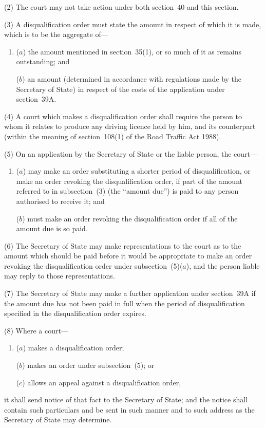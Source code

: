 \documentclass[12pt,a4paper]{article}
\begin{document}
(2) The court may not take action under both section~40 and this section.

(3) A disqualification order must state the amount in respect of which it is made, which is to be the aggregate of—
\begin{enumerate}\item[]
($a$) the amount mentioned in section~35(1), or so much of it as remains outstanding; and

($b$) an amount (determined in accordance with regulations made by the Secretary of State) in respect of the costs of the application under section~39A.
\end{enumerate}

(4) A court which makes a disqualification order shall require the person to whom it relates to produce any driving licence held by him, and its counterpart (within the meaning of section~108(1)  of the Road Traffic Act 1988).

(5) On an application by the Secretary of State or the liable person, the court—
\begin{enumerate}\item[]
($a$) may make an order substituting a shorter period of disqualification, or make an order revoking the disqualification order, if part of the amount referred to in subsection~(3)  (the “amount due”) is paid to any person authorised to receive it; and

($b$) must make an order revoking the disqualification order if all of the amount due is so paid.
\end{enumerate}

(6) The Secretary of State may make representations to the court as to the amount which should be paid before it would be appropriate to make an order revoking the disqualification order under subsection~(5)($a$), and the person liable may reply to those representations.

(7) The Secretary of State may make a further application under section~39A if the amount due has not been paid in full when the period of disqualification specified in the disqualification order expires.

(8) Where a court—
\begin{enumerate}\item[]
($a$) makes a disqualification order;

($b$) makes an order under subsection~(5); or

($c$) allows an appeal against a disqualification order,
\end{enumerate}
it shall send notice of that fact to the Secretary of State; and the notice shall contain such particulars and be sent in such manner and to such address as the Secretary of State may determine.
\end{document}
